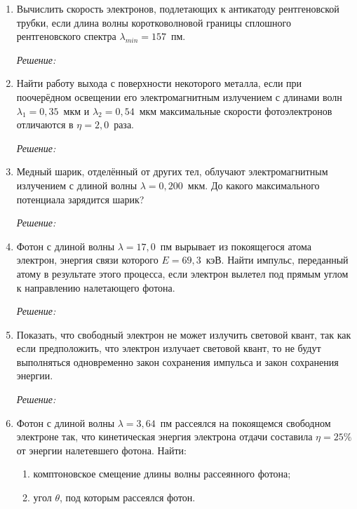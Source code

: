 \begin{enumerate}
\newpage

\item Вычислить скорость электронов, подлетающих к антикатоду рентгеновской
трубки, если длина волны коротковолновой границы сплошного рентгеновского
спектра \( \lambda_{min} = 157 \)~пм.

\emph{Решение:}

\newpage

\item Найти работу выхода с поверхности некоторого металла, если при поочерёдном
освещении его электромагнитным излучением с длинами волн \( \lambda_1 =
0,\!35 \)~мкм и \( \lambda_2 = 0,\!54 \)~мкм максимальные скорости
фотоэлектронов отличаются в \( \eta = 2,\!0 \)~раза.

\emph{Решение:}

\newpage

\item Медный шарик, отделённый от других тел, облучают электромагнитным
излучением с длиной волны \( \lambda = 0,\!200 \)~мкм. До какого максимального
потенциала зарядится шарик?

\emph{Решение:}

\newpage

\item Фотон с длиной волны \( \lambda = 17,\!0 \)~пм вырывает из покоящегося
атома электрон, энергия связи которого \( E = 69,\!3 \)~кэВ. Найти импульс,
переданный атому в результате этого процесса, если электрон вылетел под прямым
углом к направлению налетающего фотона.

\emph{Решение:}

\newpage

\item Показать, что свободный электрон не может излучить световой квант, так как
если предположить, что электрон излучает световой квант, то не будут выполняться
одновременно закон сохранения импульса и закон сохранения энергии.

\emph{Решение:}

\newpage

\item Фотон с длиной волны \( \lambda = 3,\!64 \)~пм рассеялся на покоящемся
свободном электроне так, что кинетическая энергия электрона отдачи составила
\( \eta = 25\% \) от энергии налетевшего фотона. Найти:
\begin{enumerate}
    \item комптоновское смещение длины волны рассеянного фотона;
    \item угол \( \theta \), под которым рассеялся фотон.
\end{enumerate}


\end{enumerate}
